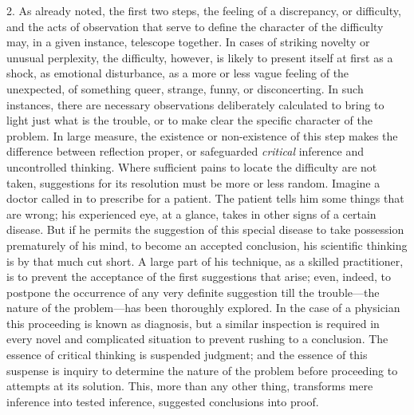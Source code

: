\documentclass[letterpaper]{book}
\begin{document}
2. As already noted, the first two steps, the feeling of a discrepancy,
or difficulty, and the acts of observation that serve to define the
character of the difficulty may, in a given instance, telescope
together. In cases of striking novelty or unusual perplexity, the
difficulty, however, is likely to present itself at first as a shock,
as
emotional disturbance, as a more or less vague feeling of the
unexpected, of something queer, strange, funny, or disconcerting. In
such instances, there are necessary observations deliberately calculated
to bring to light just what is the trouble, or to make clear the
specific character of the problem. In large measure, the existence or
non-existence of this step makes the difference between reflection
proper, or safeguarded \emph{critical} inference and uncontrolled
thinking. Where sufficient pains to locate the difficulty are not taken,
suggestions for its resolution must be more or less random. Imagine a
doctor called in to prescribe for a patient. The patient tells him some
things that are wrong; his experienced eye, at a glance, takes in other
signs of a certain disease. But if he permits the suggestion of this
special disease to take possession prematurely of his mind, to become an
accepted conclusion, his scientific thinking is by that much cut short.
A large part of his technique, as a skilled practitioner, is to prevent
the acceptance of the first suggestions that arise; even, indeed, to
postpone the occurrence of any very definite suggestion till the
trouble---the nature of the problem---has been thoroughly explored. In
the case of a physician this proceeding is known as diagnosis, but a
similar inspection is required in every novel and complicated situation
to prevent rushing to a conclusion. The essence of critical thinking is
suspended judgment; and the essence of this suspense is inquiry to
determine the nature of the problem before proceeding to attempts at its
solution. This, more than any other thing, transforms mere inference
into tested inference, suggested conclusions into proof.

\end{document}
